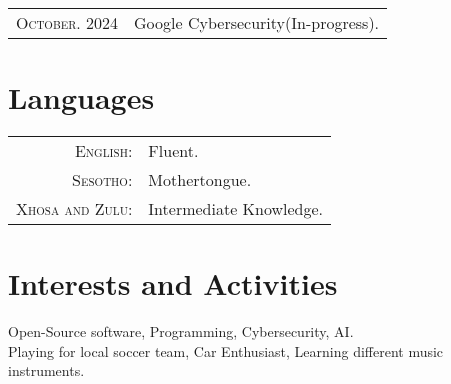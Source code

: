 \documentclass[a4paper,10pt]{article} %
\begin{document}
\begin{tabular}{rl}
\textsc{October.} 2024 & Google Cybersecurity(In-progress).\\
\end{tabular}


\section{Languages}

\begin{tabular}{rl}
\textsc{English:} & Fluent.\\
\textsc{Sesotho:} & Mothertongue.\\
\textsc{Xhosa and Zulu:} & Intermediate Knowledge.\\
\end{tabular}


\section{Interests and Activities}

Open-Source software, Programming, Cybersecurity, AI.\\
Playing for local soccer team, Car Enthusiast, Learning different music instruments.




\end{document}
